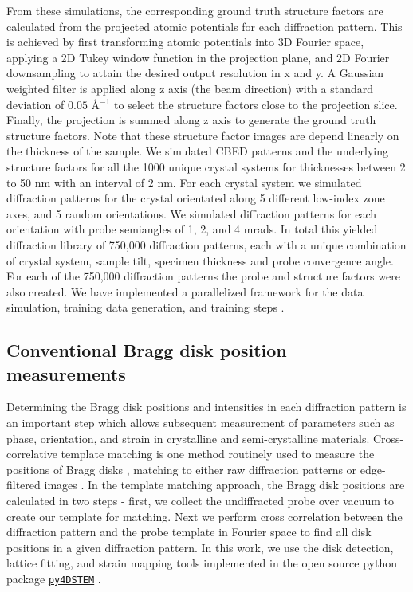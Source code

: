 \documentclass[%
 reprint,
superscriptaddress,
 amsmath,
 amssymb,
 prl,
]{revtex4-2}
\newcommand{\pyFDSTEM}{\href{https://github.com/py4dstem/py4DSTEM}{\texttt{py4DSTEM}}}
\begin{document}
From these simulations, the corresponding ground truth structure factors are calculated from the projected atomic potentials for each diffraction pattern. This is achieved by first transforming atomic potentials into 3D Fourier space, applying a 2D Tukey window function in the projection plane, and 2D Fourier downsampling to attain the desired output resolution in x and y. A Gaussian weighted filter is applied along z axis (the beam direction) with a standard deviation of $0.05$ \AA{}$^{-1}$ to select the structure factors close to the projection slice. Finally, the projection is summed along z axis to generate the ground truth structure factors. Note that these structure factor images are depend linearly on the thickness of the sample. We simulated CBED patterns and the underlying structure factors for all the 1000 unique crystal systems for thicknesses between 2 to 50 nm with an interval of 2 nm. For each crystal system we simulated diffraction patterns for the crystal orientated along 5 different low-index zone axes, and 5 random orientations. We simulated diffraction patterns for each orientation with probe semiangles of 1, 2, and 4 mrads. In total this yielded diffraction library of 750,000 diffraction patterns, each with a unique combination of crystal system, sample tilt, specimen thickness and probe convergence angle. For each of the 750,000 diffraction patterns the probe and structure factors were also created. We have implemented a parallelized framework for the data simulation, training data generation, and training steps \cite{rakoski2021database}.

\subsection*{Conventional Bragg disk position measurements}

Determining the Bragg disk positions and intensities in each diffraction pattern is an important step which allows subsequent measurement of parameters such as phase, orientation, and strain in crystalline and semi-crystalline materials. Cross-correlative template matching is one method routinely used to measure the positions of Bragg disks \citep{ozdol2015strain, pekin2017optimizing}, matching to either raw diffraction patterns or edge-filtered images \cite{mukherjee2020lattice}. In the template matching approach, the Bragg disk positions are calculated in two steps - first, we collect the undiffracted probe over vacuum to create our template for matching. Next we perform cross correlation between the diffraction pattern and the probe template in Fourier space  to find all disk positions in a given diffraction pattern. In this work, we use the disk detection, lattice fitting, and strain mapping tools implemented in the open source python package \pyFDSTEM{} \cite{savitzky2021py4dstem}.
\end{document}
